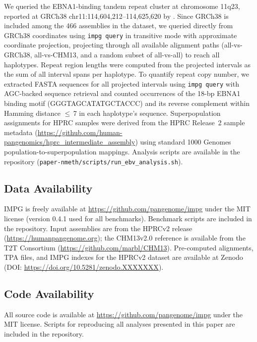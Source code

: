We queried the EBNA1-binding tandem repeat cluster at chromosome 11q23, reported at GRCh38 chr11:114,604,212--114,625,620 by \cite{Li2023}. Since GRCh38 is included among the 466 assemblies in the dataset, we queried directly from GRCh38 coordinates using \texttt{impg query} in transitive mode with approximate coordinate projection, projecting through all available alignment paths (all-vs-GRCh38, all-vs-CHM13, and a random subset of all-vs-all) to reach all haplotypes. Repeat region lengths were computed from the projected intervals as the sum of all interval spans per haplotype. To quantify repeat copy number, we extracted FASTA sequences for all projected intervals using \texttt{impg query} with AGC-backed sequence retrieval and counted occurrences of the 18-bp EBNA1 binding motif (GGGTAGCATATGCTACCC) and its reverse complement within Hamming distance $\leq$\,7 in each haplotype's sequence. Superpopulation assignments for HPRC samples were derived from the HPRC Release~2 sample metadata (\url{https://github.com/human-pangenomics/hprc_intermediate_assembly}) using standard 1000 Genomes population-to-superpopulation mappings. Analysis scripts are available in the repository (\texttt{paper-nmeth/scripts/run\_ebv\_analysis.sh}).

\subsection*{Data Availability}

IMPG is freely available at \url{https://github.com/pangenome/impg} under the MIT license (version 0.4.1 used for all benchmarks). Benchmark scripts are included in the repository. Input assemblies are from the HPRCv2 release (\url{https://humanpangenome.org}); the CHM13v2.0 reference is available from the T2T Consortium (\url{https://github.com/marbl/CHM13}). Pre-computed alignments, TPA files, and IMPG indexes for the HPRCv2 dataset are available at Zenodo (DOI: \url{https://doi.org/10.5281/zenodo.XXXXXXX}).

\subsection*{Code Availability}

All source code is available at \url{https://github.com/pangenome/impg} under the MIT license. Scripts for reproducing all analyses presented in this paper are included in the repository.
